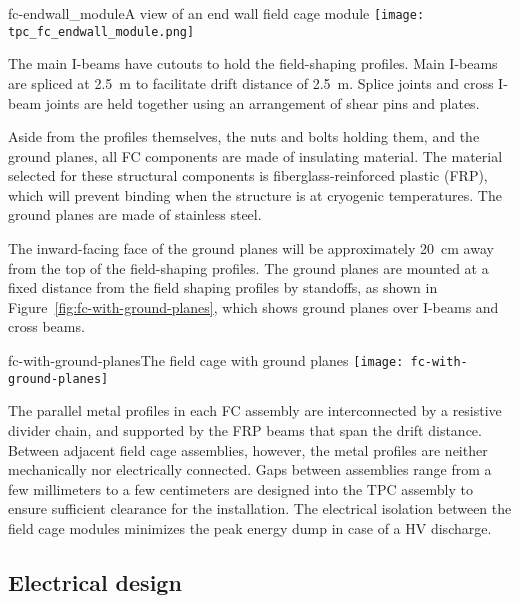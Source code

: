 \begin{cdrfigure}{fc-endwall_module}{A view of an end wall field cage module}
\texttt{[image: tpc\_fc\_endwall\_module.png]}
\end{cdrfigure}

The main I-beams have cutouts to hold the field-shaping profiles. Main I-beams are spliced at 2.5~m to facilitate drift distance  
of 2.5~m. Splice joints and cross I-beam joints are held together using an arrangement of shear pins and plates. 

Aside from the profiles themselves, the nuts and bolts holding them, and the ground planes, all FC components are made of insulating material. The material selected for these structural components is fiberglass-reinforced plastic (FRP), which will prevent binding when the structure is at cryogenic temperatures. The ground planes are made of stainless steel. 


The inward-facing face of the ground planes will be approximately 20~cm away from the top of the field-shaping profiles. The ground planes are mounted at a fixed distance from the field shaping profiles by standoffs, as shown in Figure~\ref{fig:fc-with-ground-planes}, which shows ground planes over I-beams and cross beams.

\begin{cdrfigure}{fc-with-ground-planes}{The field cage with ground planes}
\texttt{[image: fc-with-ground-planes]}
\end{cdrfigure}

The parallel metal profiles in each FC assembly 
 are interconnected by a resistive divider chain, and supported by the FRP beams that span the drift distance.  Between adjacent field cage assemblies, however,  
the metal profiles are neither mechanically nor electrically connected. Gaps between assemblies range from a few millimeters to a few centimeters are designed into the TPC assembly to ensure sufficient clearance for the installation.  The electrical isolation between the field cage modules minimizes the peak energy dump in case of a HV discharge.


\subsection{Electrical design}


